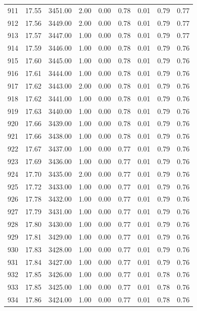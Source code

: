 \documentclass{article}\usepackage[]{graphicx}\usepackage[]{color}
\begin{document}
\begin{longtable}{rrrrrrrrr}
  911 & 17.55 & 3451.00 & 2.00 & 0.00 & 0.78 & 0.01 & 0.79 & 0.77 \\ 
  912 & 17.56 & 3449.00 & 2.00 & 0.00 & 0.78 & 0.01 & 0.79 & 0.77 \\ 
  913 & 17.57 & 3447.00 & 1.00 & 0.00 & 0.78 & 0.01 & 0.79 & 0.77 \\ 
  914 & 17.59 & 3446.00 & 1.00 & 0.00 & 0.78 & 0.01 & 0.79 & 0.76 \\ 
  915 & 17.60 & 3445.00 & 1.00 & 0.00 & 0.78 & 0.01 & 0.79 & 0.76 \\ 
  916 & 17.61 & 3444.00 & 1.00 & 0.00 & 0.78 & 0.01 & 0.79 & 0.76 \\ 
  917 & 17.62 & 3443.00 & 2.00 & 0.00 & 0.78 & 0.01 & 0.79 & 0.76 \\ 
  918 & 17.62 & 3441.00 & 1.00 & 0.00 & 0.78 & 0.01 & 0.79 & 0.76 \\ 
  919 & 17.63 & 3440.00 & 1.00 & 0.00 & 0.78 & 0.01 & 0.79 & 0.76 \\ 
  920 & 17.66 & 3439.00 & 1.00 & 0.00 & 0.78 & 0.01 & 0.79 & 0.76 \\ 
  921 & 17.66 & 3438.00 & 1.00 & 0.00 & 0.78 & 0.01 & 0.79 & 0.76 \\ 
  922 & 17.67 & 3437.00 & 1.00 & 0.00 & 0.77 & 0.01 & 0.79 & 0.76 \\ 
  923 & 17.69 & 3436.00 & 1.00 & 0.00 & 0.77 & 0.01 & 0.79 & 0.76 \\ 
  924 & 17.70 & 3435.00 & 2.00 & 0.00 & 0.77 & 0.01 & 0.79 & 0.76 \\ 
  925 & 17.72 & 3433.00 & 1.00 & 0.00 & 0.77 & 0.01 & 0.79 & 0.76 \\ 
  926 & 17.78 & 3432.00 & 1.00 & 0.00 & 0.77 & 0.01 & 0.79 & 0.76 \\ 
  927 & 17.79 & 3431.00 & 1.00 & 0.00 & 0.77 & 0.01 & 0.79 & 0.76 \\ 
  928 & 17.80 & 3430.00 & 1.00 & 0.00 & 0.77 & 0.01 & 0.79 & 0.76 \\ 
  929 & 17.81 & 3429.00 & 1.00 & 0.00 & 0.77 & 0.01 & 0.79 & 0.76 \\ 
  930 & 17.83 & 3428.00 & 1.00 & 0.00 & 0.77 & 0.01 & 0.79 & 0.76 \\ 
  931 & 17.84 & 3427.00 & 1.00 & 0.00 & 0.77 & 0.01 & 0.79 & 0.76 \\ 
  932 & 17.85 & 3426.00 & 1.00 & 0.00 & 0.77 & 0.01 & 0.78 & 0.76 \\ 
  933 & 17.85 & 3425.00 & 1.00 & 0.00 & 0.77 & 0.01 & 0.78 & 0.76 \\ 
  934 & 17.86 & 3424.00 & 1.00 & 0.00 & 0.77 & 0.01 & 0.78 & 0.76 \\ 

\end{longtable}
\end{document}
